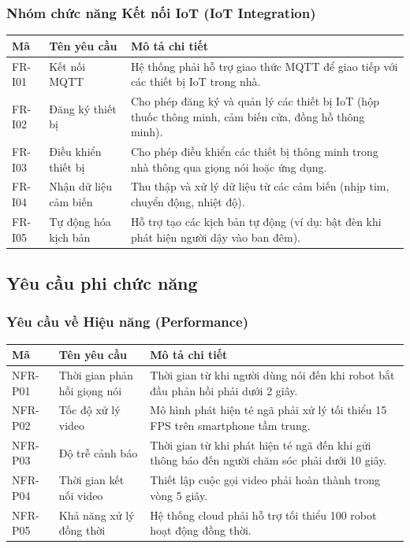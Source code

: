 \subsubsection{Nhóm chức năng Kết nối IoT (IoT Integration)}

\begin{table}[h!]
\centering
\label{tab:req-iot}
\begin{tabular}{|L{1.5cm}|L{3.5cm}|L{8.5cm}|}
\hline
\textbf{Mã} & \textbf{Tên yêu cầu} & \textbf{Mô tả chi tiết} \\
\hline
FR-I01 & Kết nối MQTT & Hệ thống phải hỗ trợ giao thức MQTT để giao tiếp với các thiết bị IoT trong nhà. \\
\hline
FR-I02 & Đăng ký thiết bị & Cho phép đăng ký và quản lý các thiết bị IoT (hộp thuốc thông minh, cảm biến cửa, đồng hồ thông minh). \\
\hline
FR-I03 & Điều khiển thiết bị & Cho phép điều khiển các thiết bị thông minh trong nhà thông qua giọng nói hoặc ứng dụng. \\
\hline
FR-I04 & Nhận dữ liệu cảm biến & Thu thập và xử lý dữ liệu từ các cảm biến (nhịp tim, chuyển động, nhiệt độ). \\
\hline
FR-I05 & Tự động hóa kịch bản & Hỗ trợ tạo các kịch bản tự động (ví dụ: bật đèn khi phát hiện người dậy vào ban đêm). \\
\hline
\end{tabular}
\end{table}

\newpage
\subsection{Yêu cầu phi chức năng}
\subsubsection{Yêu cầu về Hiệu năng (Performance)}

\begin{table}[h!]
\centering
\label{tab:nfr-perf}
\begin{tabular}{|L{1.5cm}|L{3.5cm}|L{8.5cm}|}
\hline
\textbf{Mã} & \textbf{Tên yêu cầu} & \textbf{Mô tả chi tiết} \\
\hline
NFR-P01 & Thời gian phản hồi giọng nói & Thời gian từ khi người dùng nói đến khi robot bắt đầu phản hồi phải dưới 2 giây. \\
\hline
NFR-P02 & Tốc độ xử lý video & Mô hình phát hiện té ngã phải xử lý tối thiểu 15 FPS trên smartphone tầm trung. \\
\hline
NFR-P03 & Độ trễ cảnh báo & Thời gian từ khi phát hiện té ngã đến khi gửi thông báo đến người chăm sóc phải dưới 10 giây. \\
\hline
NFR-P04 & Thời gian kết nối video & Thiết lập cuộc gọi video phải hoàn thành trong vòng 5 giây. \\
\hline
NFR-P05 & Khả năng xử lý đồng thời & Hệ thống cloud phải hỗ trợ tối thiểu 100 robot hoạt động đồng thời. \\
\hline
\end{tabular}
\end{table}
\newpage
